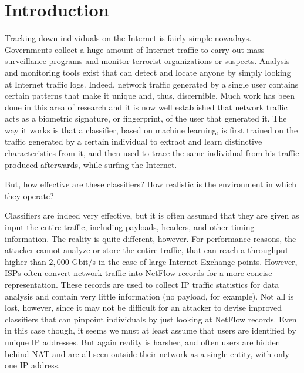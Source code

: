 \documentclass[10pt,conference,compsocconf,letterpaper]{IEEEtran}
\begin{document}
\section{Introduction}

Tracking down individuals on the Internet is fairly simple nowadays. 
Governments collect a huge amount of Internet traffic to carry out mass surveillance programs
and  monitor terrorist organizations or suspects. Analysis and monitoring tools 
exist that can detect and locate anyone by simply looking at Internet traffic logs. 
Indeed, network traffic generated by a single user contains certain patterns that make 
it unique and, thus, discernible. Much work has been done in this area of research and it is now well established that network traffic acts as a biometric signature, or fingerprint, of the user that generated it.
The way it works is that a classifier, based on machine learning, is first trained on the traffic generated by a certain individual to extract and learn distinctive characteristics from it, and then used to trace the same individual from his traffic produced afterwards, while surfing the Internet. 

But, how effective are these classifiers? How realistic is the environment in which they operate?

Classifiers are indeed very effective, but it is often assumed that they are given as input the entire traffic, including payloads, headers, and other timing information. The reality is quite different, however. For performance reasons, the attacker cannot analyze or store the entire traffic, that can reach a throughput higher than $2,000$ Gbit/s in the case of large Internet Exchange points. However, ISPs often convert network traffic into NetFlow records for a more concise representation. These records are used to collect IP traffic statistics for data analysis and contain very little information (no payload, for example). Not all is lost, however, since it may not be difficult for an attacker to devise improved classifiers that can pinpoint individuals by just looking at NetFlow records. Even in this case though, it seems we must at least assume that users are identified by unique IP addresses.  But again reality is harsher, and often users are hidden behind NAT and are all seen outside their network as a single entity, with only one IP address. 
\end{document}

